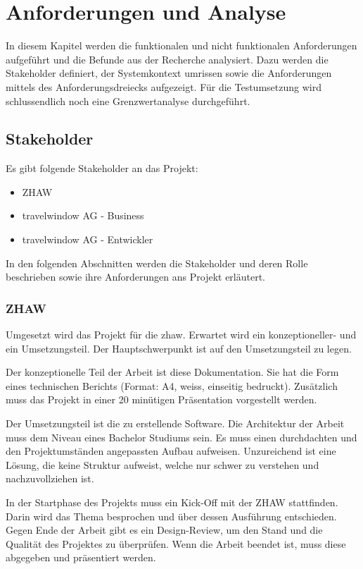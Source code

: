

\chapter{Anforderungen und Analyse}
\label{sec:analyse}
In diesem Kapitel werden die funktionalen und nicht funktionalen Anforderungen aufgeführt und die Befunde aus der Recherche analysiert. Dazu werden die Stakeholder definiert, der Systemkontext umrissen sowie die Anforderungen mittels des Anforderungsdreiecks aufgezeigt. Für die Testumsetzung wird schlussendlich noch eine Grenzwertanalyse durchgeführt.

\section{Stakeholder}
Es gibt folgende Stakeholder an das Projekt:
\begin{itemize}
\item ZHAW
\item travelwindow AG - Business
\item travelwindow AG - Entwickler
\end{itemize}

In den folgenden Abschnitten werden die Stakeholder und deren Rolle beschrieben sowie ihre Anforderungen ans Projekt erläutert.

\subsection{ZHAW}
Umgesetzt wird das Projekt für die \gls{zhaw}. Erwartet wird ein konzeptioneller- und ein Umsetzungsteil. Der Hauptschwerpunkt ist auf den Umsetzungsteil zu legen.

Der konzeptionelle Teil der Arbeit ist diese Dokumentation. Sie hat die Form eines technischen Berichts (Format: A4, weiss, einseitig bedruckt). Zusätzlich muss das Projekt in einer 20 minütigen Präsentation vorgestellt werden.

Der Umsetzungsteil ist die zu erstellende Software. Die Architektur der Arbeit muss dem Niveau eines Bachelor Studiums sein. Es muss einen durchdachten und den Projektumständen angepassten Aufbau aufweisen. Unzureichend ist eine Lösung, die keine Struktur aufweist, welche nur schwer zu verstehen und nachzuvollziehen ist.

In der Startphase des Projekts muss ein Kick-Off mit der ZHAW stattfinden. Darin wird das Thema besprochen und über dessen Ausführung entschieden. Gegen Ende der Arbeit gibt es ein Design-Review, um den Stand und die Qualität des Projektes zu überprüfen. Wenn die Arbeit beendet ist, muss diese abgegeben und präsentiert werden.

